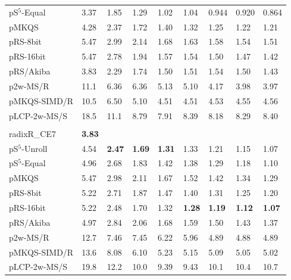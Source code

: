 \documentclass[a4paper]{myjournal}
\begin{document}
\begin{table}
\begin{tabularx}{\linewidth}{l|*{8}{>{\hfill}X}|@{}}
 pS$^5$-Equal &     3.37 &     1.85 &     1.29 &      1.02 &      1.04 &     0.944 &     0.920 &     0.864 \\
        pMKQS &     4.28 &     2.37 &     1.72 &      1.40 &      1.32 &      1.25 &      1.22 &      1.21 \\
     pRS-8bit &     5.47 &     2.99 &     2.14 &      1.68 &      1.63 &      1.58 &      1.54 &      1.51 \\
    pRS-16bit &     5.47 &     2.78 &     1.94 &      1.57 &      1.54 &      1.50 &      1.47 &      1.42 \\
    pRS/Akiba &     3.83 &     2.29 &     1.74 &      1.50 &      1.51 &      1.54 &      1.50 &      1.43 \\
     p2w-MS/R &     11.1 &     6.36 &     6.36 &      5.13 &      5.10 &      4.17 &      3.98 &      3.97 \\
 pMKQS-SIMD/R &     10.5 &     6.50 &     5.10 &      4.51 &      4.51 &      4.53 &      4.55 &      4.56 \\
 pLCP-2w-MS/S &     18.5 &     11.1 &     8.79 &      7.91 &      8.39 &      8.18 &      8.29 &      8.40 \\ \hline
& \multicolumn{8}{l|}{\textbf{Sinha NoDup} (complete), $n = 31.6\,\text{M}$, $N = 382\,\text{Mi}$, $\frac{D}{N} = 73.4\,\%$} \\ \cline{2-9}
radixR\_CE7 & \bf 3.83 &  &  &  &  &  &  &  \\
pS$^5$-Unroll & 4.54 & \bf 2.47 & \bf 1.69 & \bf 1.31 &     1.33 &     1.21 &     1.15 &     1.07 \\
 pS$^5$-Equal & 4.96 &     2.68 &     1.83 &     1.42 &     1.38 &     1.29 &     1.18 &     1.10 \\
        pMKQS & 5.47 &     2.98 &     2.11 &     1.67 &     1.52 &     1.42 &     1.34 &     1.29 \\
     pRS-8bit & 5.22 &     2.71 &     1.87 &     1.47 &     1.40 &     1.31 &     1.25 &     1.20 \\
    pRS-16bit & 5.22 &     2.48 &     1.70 &     1.32 & \bf 1.28 & \bf 1.19 & \bf 1.12 & \bf 1.07 \\
    pRS/Akiba & 4.97 &     2.84 &     2.06 &     1.68 &     1.59 &     1.50 &     1.43 &     1.37 \\
     p2w-MS/R & 12.7 &     7.46 &     7.45 &     6.22 &     5.96 &     4.89 &     4.88 &     4.89 \\
 pMKQS-SIMD/R & 13.6 &     8.08 &     6.10 &     5.23 &     5.15 &     5.09 &     5.05 &     5.02 \\
 pLCP-2w-MS/S & 19.8 &     12.2 &     10.0 &     9.39 &     9.43 &     10.1 &     10.4 &     10.7 \\ \hline
\end{tabularx}
\end{table}
\end{document}
